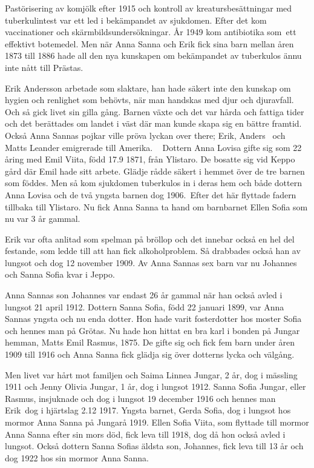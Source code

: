 Pastörisering av komjölk efter 1915 och kontroll av kreatursbesättningar med tuberkulintest var ett led i bekämpandet av sjukdomen. Efter det kom vaccinationer och skärmbildsundersökningar. År 1949 kom antibiotika som ett effektivt botemedel. Men när Anna Sanna och Erik fick sina barn mellan åren 1873 till 1886 hade all den nya kunskapen om bekämpandet av tuberkulos ännu inte nått till Prästas.

Erik Andersson arbetade som slaktare, han hade säkert inte den kunskap om hygien och renlighet som behövts, när man handskas med djur och djuravfall. Och så gick livet sin gilla gång. Barnen växte och det var hårda och fattiga tider och det berättades om landet i väst där man kunde skapa sig en bättre framtid. Också Anna Sannas pojkar ville pröva lyckan over there; Erik, Anders  och Matts Leander emigrerade till Amerika.
  
Dottern Anna Lovisa gifte sig som 22 åring med Emil Viita, född 17.9 1871, från Ylistaro. De bosatte sig vid Keppo gård där Emil hade sitt arbete. Glädje rådde säkert i hemmet över de tre barnen som föddes. Men så kom sjukdomen tuberkulos in i deras hem och både dottern Anna Lovisa och de två yngsta barnen dog 1906. Efter det här flyttade fadern tillbaka till Ylistaro. Nu fick Anna Sanna ta hand om barnbarnet Ellen Sofia som nu var 3 år gammal.

Erik var ofta anlitad som spelman på bröllop och det innebar också en hel del festande, som ledde till att han fick alkoholproblem. Så drabbades också han av lungsot och dog 12 november 1909. Av Anna Sannas sex barn var nu Johannes och Sanna Sofia kvar i Jeppo.

Anna Sannas son Johannes var endast 26 år gammal när han också avled i lungsot 21 april 1912. Dottern Sanna Sofia, född 22 januari 1899, var Anna Sannas yngsta och nu enda dotter. Hon hade varit fosterdotter hos moster Sofia och hennes man på Grötas. Nu hade hon hittat en bra karl i bonden på Jungar hemman, Matts Emil Rasmus,  1875.
De gifte sig och fick fem barn under åren 1909 till 1916 och Anna Sanna fick glädja sig över dotterns lycka och välgång.

Men livet var hårt mot familjen och Saima Linnea Jungar, 2 år, dog i mässling 1911 och Jenny Olivia Jungar, 1 år, dog i lungsot 1912. Sanna Sofia Jungar, eller Rasmus, insjuknade och dog i lungsot 19 december 1916 och hennes man Erik dog i hjärtslag 2.12 1917. Yngsta barnet, Gerda Sofia, dog i lungsot hos mormor Anna Sanna på Jungarå 1919. Ellen Sofia Viita, som flyttade till mormor Anna Sanna efter sin mors död, fick leva till 1918, dog då hon också avled i lungsot. Också dottern Sanna Sofias äldsta son, Johannes, fick leva till 13 år och dog 1922 hos sin mormor Anna Sanna.

